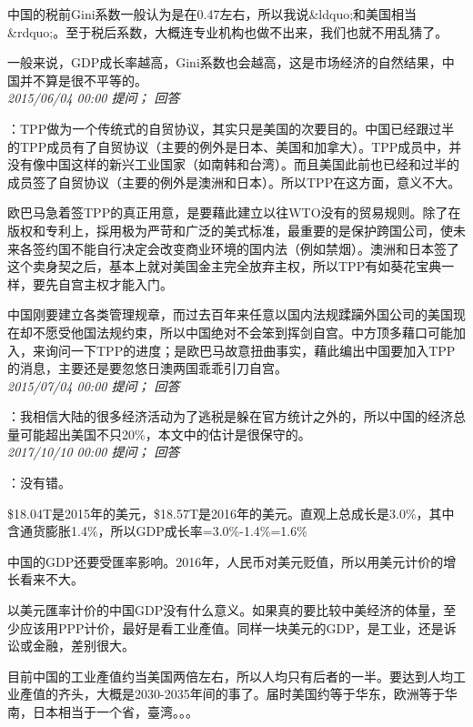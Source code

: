 \documentclass[twocolumn]{ctexart}
\begin{document}
中国的税前Gini系数一般认为是在0.47左右，所以我说\&ldquo;和美国相当\&rdquo;。至于税后系数，大概连专业机构也做不出来，我们也就不用乱猜了。

一般来说，GDP成长率越高，Gini系数也会越高，这是市场经济的自然结果，中国并不算是很不平等的。\\

\textit{\hfill\noindent\small 2015/06/04 00:00 提问； 回答}

：TPP做为一个传统式的自贸协议，其实只是美国的次要目的。中国已经跟过半的TPP成员有了自贸协议（主要的例外是日本、美国和加拿大）。TPP成员中，并没有像中国这样的新兴工业国家（如南韩和台湾）。而且美国此前也已经和过半的成员签了自贸协议（主要的例外是澳洲和日本）。所以TPP在这方面，意义不大。

欧巴马急着签TPP的真正用意，是要藉此建立以往WTO没有的贸易规则。除了在版权和专利上，採用极为严苛和广泛的美式标准，最重要的是保护跨国公司，使未来各签约国不能自行决定会改变商业环境的国内法（例如禁烟）。澳洲和日本签了这个卖身契之后，基本上就对美国金主完全放弃主权，所以TPP有如葵花宝典一样，要先自宫主权才能入门。

中国刚要建立各类管理规章，而过去百年来任意以国内法规蹂躏外国公司的美国现在却不愿受他国法规约束，所以中国绝对不会笨到挥剑自宫。中方顶多藉口可能加入，来询问一下TPP的进度；是欧巴马故意扭曲事实，藉此编出中国要加入TPP的消息，主要还是要忽悠日澳两国乖乖引刀自宫。\\

\textit{\hfill\noindent\small 2015/07/04 00:00 提问； 回答}

：我相信大陆的很多经济活动为了逃税是躲在官方统计之外的，所以中国的经济总量可能超出美国不只20\%，本文中的估计是很保守的。\\

\textit{\hfill\noindent\small 2017/10/10 00:00 提问； 回答}

：没有错。

\$18.04T是2015年的美元，\$18.57T是2016年的美元。直观上总成长是3.0\%，其中含通货膨胀1.4\%，所以GDP成长率=3.0\%-1.4\%=1.6\%

中国的GDP还要受匯率影响。2016年，人民币对美元贬值，所以用美元计价的增长看来不大。

以美元匯率计价的中国GDP没有什么意义。如果真的要比较中美经济的体量，至少应该用PPP计价，最好是看工业產值。同样一块美元的GDP，是工业，还是诉讼或金融，差别很大。

目前中国的工业產值约当美国两倍左右，所以人均只有后者的一半。要达到人均工业產值的齐头，大概是2030-2035年间的事了。届时美国约等于华东，欧洲等于华南，日本相当于一个省，臺湾。。。\\
\end{document}

